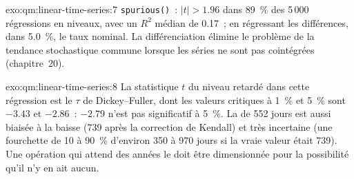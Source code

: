 \begin{solution}{exo:qm:linear-time-series:7}
\texttt{spurious()}~: $|t| > 1.96$ dans 89~\% des 5\,000 régressions en niveaux, avec un $R^2$ médian de 0.17~; en régressant les différences, dans 5.0~\%, le
taux nominal. La différenciation élimine le problème de la tendance stochastique commune lorsque les séries ne sont pas cointégrées (chapitre~20).
\end{solution}

\begin{solution}{exo:qm:linear-time-series:8}
La statistique $t$ du niveau retardé dans cette régression est le $\tau$ de Dickey--Fuller, dont les valeurs critiques à 1~\% et 5~\% sont $-3.43$ et $-2.86$~: $-2.79$
n'est pas significatif à 5~\%. La  de 552 jours est aussi biaisée à la baisse (739 après la correction de Kendall) et très incertaine (une fourchette de 10 à 90~\% d'environ
350 à 970 jours si la vraie valeur était 739). Une opération qui attend des années le  doit être dimensionnée pour la possibilité qu'il n'y en ait aucun.
\end{solution}

